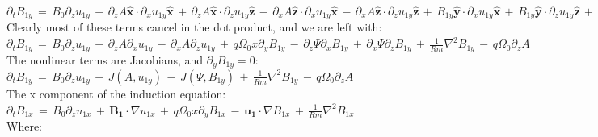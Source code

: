 \documentclass[letterpaper,12pt]{article}
\newcommand\reym{\mathrel{Rm}}
\begin{document}
$\partial_t B_{1y} \, = \, B_0 \partial_z u_{1y} \, + \, \partial_z A \mathbf{\hat{x}} \cdot \partial_x u_{1y}\mathbf{\hat{x}} \, + \, \partial_z A \mathbf{\hat{x}} \cdot \partial_z u_{1y} \mathbf{\hat{z}} \, - \, \partial_x A \mathbf{\hat{z}} \cdot \partial_x u_{1y} \mathbf{\hat{x}} \, - \, \partial_x A \mathbf{\hat{z}} \cdot \partial_z u_{1y} \mathbf{\hat{z}} \, + \, B_{1y}\mathbf{\hat{y}} \cdot \partial_x u_{1y} \mathbf{\hat{x}} \, + \, B_{1y}\mathbf{\hat{y}} \cdot \partial_z u_{1y} \mathbf{\hat{z}} \, + \, q\Omega_0 x \partial_y B_{1y} \mathbf{\hat{y}} \, - \, \partial_z\Psi\mathbf{\hat{x}}\cdot \partial_x B_{1y} \mathbf{\hat{x}} \, - \, \partial_z\Psi\mathbf{\hat{x}}\cdot \partial_z B_{1y} \mathbf{\hat{z}} \, + \, \partial_x\Psi\mathbf{\hat{z}}\cdot \partial_x B_{1y} \mathbf{\hat{x}} \, + \, \partial_x\Psi\mathbf{\hat{z}}\cdot \partial_z B_{1y} \mathbf{\hat{z}} \, - \, u_{1y} \mathbf{\hat{y}} \partial_x B_{1y} \mathbf{\hat{x}} \, - \, u_{1y}\mathbf{\hat{y}} \partial_z B_{1y} \mathbf{\hat{z}} \, + \, \frac{1}{\reym} \nabla^2 B_{1y} \, - \, q\Omega_0 \left(\partial_z A \right)$ \\

Clearly most of these terms cancel in the dot product, and we are left with: \\

$\partial_t B_{1y} \, = \, B_0 \partial_z u_{1y} \, + \, \partial_z A \partial_x u_{1y} \, - \, \partial_x A \partial_z u_{1y} \, + \, q\Omega_0 x \partial_y B_{1y} \, - \, \partial_z\Psi \partial_x B_{1y} \, + \, \partial_x\Psi \partial_z B_{1y} \, + \, \frac{1}{\reym} \nabla^2 B_{1y} \, - \, q \Omega_0 \partial_z A$ \\

The nonlinear terms are Jacobians, and $\partial_y B_{1y} = 0$: \\

$\partial_t B_{1y} \, = \, B_0 \partial_z u_{1y} \, + \, J\left(A, u_{1y}\right) \, - \, J\left(\Psi, B_{1y}\right) \, + \, \frac{1}{\reym} \nabla^2 B_{1y}  \, - \, q \Omega_0 \partial_z A$ \\

The x component of the induction equation: \\

$\partial_t B_{1x} \, = \, B_0 \partial_z u_{1x} \, + \, \mathbf{B_1} \cdot \nabla u_{1x} \, + \, q \Omega_0 x \partial_y B_{1x} \, - \, \mathbf{u_1} \cdot \nabla B_{1x} \, + \, \frac{1}{\reym} \nabla^2 B_{1x}$ \\

Where: \\
\end{document}
